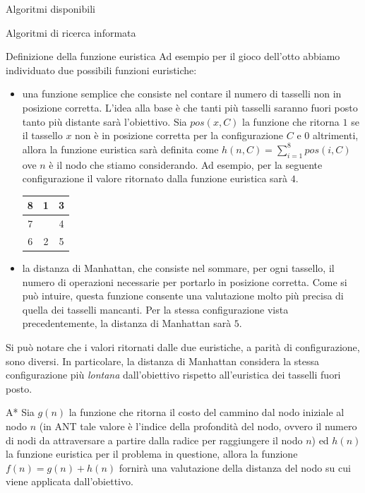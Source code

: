 \begin{chapter}{Algoritmi disponibili}
\begin{section}{Algoritmi di ricerca informata}
\begin{subsection}{Definizione della funzione euristica}
    Ad esempio per il gioco dell'otto abbiamo individuato due possibili funzioni euristiche:
    \begin{itemize}
        \item una funzione semplice che consiste nel contare il numero di tasselli non in
        posizione corretta. L'idea alla base \`e che tanti pi\`u tasselli saranno fuori posto
        tanto pi\`u distante sar\`a l'obiettivo.
        Sia $pos(x, C)$ la funzione che ritorna $1$ se il tassello $x$ non \`e in posizione corretta
        per la configurazione $C$ e $0$ altrimenti, allora la funzione euristica sar\`a definita come
        $h(n, C) = \sum_{i=1}^{8}{pos(i, C)}$ ove $n$ \`e il nodo che stiamo considerando. Ad esempio,
        per la seguente configurazione il valore ritornato dalla funzione euristica sar\`a $4$.

        \begin{center}
        \begin{tabular}{| c | c | c |}
        \hline
        8 & 1 & 3\\\hline
        7 &   & 4\\\hline
        6 & 2 & 5\\\hline
        \end{tabular}
        \end{center}

        \item la distanza di Manhattan, che consiste nel sommare, per ogni tassello, il numero
        di operazioni necessarie per portarlo in posizione corretta. Come si pu\`o intuire,
        questa funzione consente una valutazione molto pi\`u precisa di quella dei
        tasselli mancanti. Per la stessa configurazione vista precedentemente, la distanza di
        Manhattan sar\`a $5$.
    \end{itemize}

    Si pu\`o notare che i valori ritornati dalle due euristiche, a parit\`a di configurazione,
    sono diversi. In particolare, la distanza di Manhattan considera la stessa configurazione
    pi\`u \textit{lontana} dall'obiettivo rispetto all'euristica dei tasselli fuori posto.
    \end{subsection}

    \begin{subsection}{A*}
    Sia $g(n)$ la funzione che ritorna il costo del cammino dal nodo iniziale al nodo $n$ (in ANT
    tale valore \`e l'indice della profondit\`a del nodo, ovvero il numero di nodi da attraversare
    a partire dalla radice per raggiungere il nodo $n$) ed $h(n)$ la funzione euristica per il
    problema in questione, allora la funzione $f(n) = g(n) + h(n)$ fornir\`a una valutazione della
    distanza del nodo su cui viene applicata dall'obiettivo.


\end{subsection}
\end{section}
\end{chapter}
